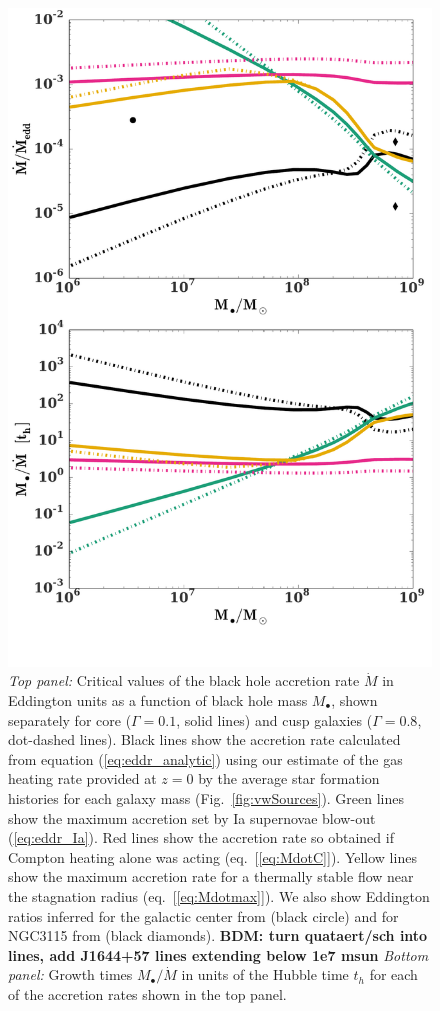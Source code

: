\documentclass[usenatbib,fleqn]{mn2e}
\newcommand{\Mdot}{\dot{M}}
\newcommand{\Mbh}[1][]{M_{\bullet#1}}
\renewcommand{\th}{t_h}
\begin{document}
\begin{figure}
\includegraphics[width=\columnwidth]{mdot_sfr.pdf}
\caption{\label{fig:bh_growth} {\it Top panel:} Critical values of the
  black hole accretion rate $\dot{M}$ in Eddington units as a function
  of black hole mass $M_{\bullet}$, shown separately for core
  ($\Gamma=0.1$, solid lines) and cusp galaxies ($\Gamma=0.8$,
  dot-dashed lines).  Black lines show the accretion rate calculated
  from equation (\ref{eq:eddr_analytic}) using our estimate of the gas
  heating rate provided at $z = 0$ by the average star formation
  histories for each galaxy mass (Fig.~\ref{fig:vwSources}).  Green
  lines show the maximum accretion set by Ia supernovae blow-out
  (\ref{eq:eddr_Ia}).  Red lines show the accretion rate so obtained
  if Compton heating alone was acting (eq.~[\ref{eq:MdotC}]).  Yellow
  lines show the maximum accretion rate for a thermally stable flow
  near the stagnation radius (eq.~[\ref{eq:Mdotmax}]).  We also show
  Eddington ratios inferred for the galactic center from
  \citet{Quataert:2004a} (black circle) and for NGC3115 from
  \citet{ShcherbakovWong+:2014a} (black diamonds).  {\bf BDM: turn quataert/sch into lines, add J1644+57 lines extending below 1e7 msun} {\it Bottom
    panel:} Growth times $\Mbh/\Mdot$ in units of the Hubble time
  $\th$ for each of the accretion rates shown in the top panel.}
\end{figure}
\end{document}
